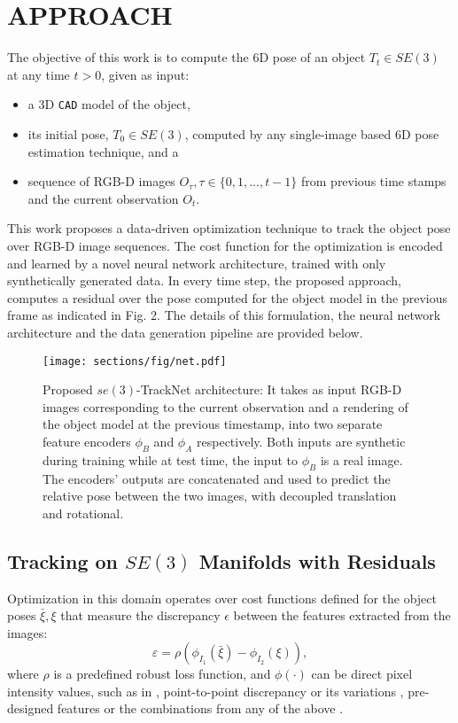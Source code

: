 \documentclass[letterpaper, 10 pt, conference]{ieeeconf}
\begin{document}
\section{APPROACH}
The objective of this work is to compute the 6D pose of an object $T_t \in SE(3)$ at any time $t > 0$, given as input:
\begin{itemize}
    \item a 3D {\tt CAD} model of the object,
    \item its initial pose, $T_0 \in SE(3) $, computed by any single-image based 6D pose estimation technique, and a
    \item sequence of RGB-D images $O_{\tau }, \tau \in \{0,1,...,t-1\}$ from previous time stamps and the current observation $O_t$.
\end{itemize}
This work proposes a data-driven optimization technique to track the object pose over RGB-D image sequences. The cost function for the optimization is encoded and learned by a novel neural network architecture, trained with only synthetically generated data. In every time step, the proposed approach, computes a residual over the pose computed for the object model in the previous frame as indicated in Fig. 2. The details of this formulation, the neural network architecture and the data generation pipeline are provided below.


\begin{figure*}[t]
  \centering
  \texttt{[image: sections/fig/net.pdf]}
  \vspace{-.15in}
  \caption{Proposed $se(3)$-TrackNet architecture: It takes as input RGB-D images corresponding to the current observation and a rendering of the object model at the previous timestamp, into two separate feature encoders $\phi_B$ and $\phi_A$ respectively. Both inputs are synthetic during training while at test time, the input to $\phi_B$ is a real image. The encoders' outputs are concatenated and used to predict the relative pose between the two images, with decoupled translation and rotational. \vspace{-0.2in}}
  \label{fig:pipeline}
\end{figure*}



\subsection{Tracking on $SE(3)$ Manifolds with Residuals}
\label{sec:se3}

Optimization in this domain operates over cost functions defined for the object poses $\bar{\xi}, \xi$ that measure the discrepancy $\epsilon$ between the features extracted from the images:
$$\varepsilon = \rho(\phi_{I_1} (\bar{\xi}) - \phi _{I_2}(\xi)),$$ where $\rho$ is a predefined robust loss function, and $\phi(\cdot)$ can be direct pixel intensity values, such as in \cite{engel2017direct}, point-to-point discrepancy or its variations \cite{besl1992method}, pre-designed features \cite{hebert2012combined} or the combinations from any of the above \cite{pauwels2015simtrack}. 
\end{document}
